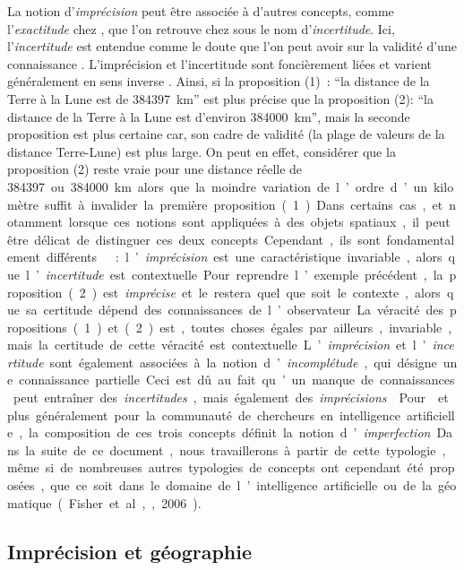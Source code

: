 La notion d’\emph{imprécision} peut être associée à d’autres concepts,
comme l’\emph{exactitude} chez \textcite{Russell1923}, que l’on
retrouve chez \textcite{Bouchon-Meunier1995,Bouchon-Meunier2007} sous
le nom d’\emph{incertitude}. Ici, l’\emph{incertitude} est entendue
comme le doute que l’on peut avoir sur la validité d’une connaissance
\autocite{Bouchon-Meunier1995}. L’imprécision et l’incertitude sont
foncièrement liées et varient généralement en sens inverse
\autocite{Russell1923}. Ainsi, si la proposition (1) : \enquote{la
  distance de la Terre à la Lune est de \SI{384397}{\km}} est plus
  précise que la proposition (2): \enquote{la distance de la Terre à
    la Lune est d’environ \SI{384000}{\km}}, mais la seconde
  proposition est plus certaine car, son cadre de validité (la plage
  de valeurs de la distance Terre-Lune) est plus large. On peut en
  effet, considérer que la proposition (2) reste vraie pour une
  distance réelle de \SI{384397} ou \SI{384000}{\km} alors que la
moindre variation de l’ordre d’un kilomètre suffit à invalider la
première proposition (1). Dans certains cas, et notamment lorsque ces
notions sont appliquées à des objets spatiaux, il peut être délicat de
distinguer ces deux concepts. Cependant, ils sont fondamentalement
différents : l’\emph{imprécision} est une caractéristique invariable,
alors que l’\emph{incertitude} est contextuelle. Pour reprendre
l’exemple précédent, la proposition (2) est \emph{imprécise} et le
restera quel que soit le contexte, alors que sa certitude dépend des
connaissances de l’observateur. La véracité des propositions (1) et
(2) est, toutes choses égales par ailleurs, invariable, mais la
certitude de cette véracité est contextuelle.

L’\emph{imprécision} et l’\emph{incertitude} sont également associées
à la notion d’\emph{incomplétude}, qui désigne une connaissance
partielle. Ceci est dû au fait qu’un manque de connaissances peut
entraîner des \emph{incertitudes}, mais également des
\emph{imprécisions}
\autocite{Bouchon-Meunier1995,Bouchon-Meunier2007}. Pour
\textcite{Bouchon-Meunier1995} et plus généralement pour la communauté
de chercheurs en intelligence artificielle, la composition de ces
trois concepts définit la notion d’\emph{imperfection}. Dans la suite
de ce document, nous travaillerons à partir de cette typologie, même
si de nombreuses autres typologies de concepts ont cependant été
proposées, que ce soit dans le domaine de l’intelligence artificielle
ou de la géomatique (Fisher et al.,, 2006).

\subsection{Imprécision et géographie}

